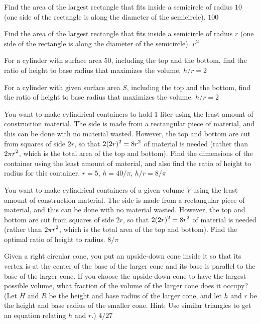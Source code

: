 \exercise
Find the area of the largest rectangle that fits inside a semicircle of
radius $10$ (one side of the rectangle is along the diameter of the
semicircle).
\answer $100$
\endanswer
\endexercise

\exercise
Find the area of the largest rectangle that fits inside a semicircle of
radius $r$ (one side of the rectangle is along the diameter of the
semicircle).
\answer $\displaystyle r^2$
\endanswer
\endexercise

\exercise
For a cylinder with surface area $50$, including 
the top and the bottom, find the ratio of height to
base radius that maximizes the volume.
\answer $h/r=2$
\endanswer
\endexercise

\exercise
For a cylinder with given surface area $S$, including 
the top and the bottom, find the ratio of height to
base radius that maximizes the volume.
\answer $h/r=2$
\endanswer
\endexercise

\exercise
You want to make cylindrical containers to hold 1 liter using the
least amount of construction material.  The side is made from a
rectangular piece of material, and this can be done with no material
wasted.  However, the top and bottom are cut from squares of side $2r$, so
that $\displaystyle 2(2r)^2=8r^2$ of material is needed (rather than $\displaystyle 2\pi r^2$, which is
the total area of the top and bottom).  Find the dimensions of the
container using the least amount of material, and also find the
ratio of height to
radius for this container.
\answer $r=5$, $h=40/\pi$, $h/r=8/\pi$
\endanswer
\endexercise

\exercise
You want to make cylindrical containers of a given volume $V$ using the
least amount of construction material.  The side is made from a
rectangular piece of material, and this can be done with no material
wasted.  However, the top and bottom are cut from squares of side $2r$, so
that $\displaystyle 2(2r)^2=8r^2$ of material is needed (rather than $\displaystyle 2\pi r^2$, which is
the total area of the top and bottom).  Find the optimal ratio of height to
radius.
\answer $8/\pi$
\endanswer
\endexercise

\exercise
Given a right circular cone, you put an upside-down cone inside it so that
its vertex is at the center of the base of the larger cone and its base is
parallel to the base of the larger cone.  If you choose the upside-down
cone to have the largest possible volume, what fraction of the volume of
the larger cone does it occupy?  (Let $H$ and $R$ be the height and base
radius of the larger cone, and let $h$ and $r$ be the height and base
radius of the smaller cone.  Hint: Use similar triangles to get an equation
relating $h$ and $r$.)
\answer $4/27$
\endanswer
\endexercise

